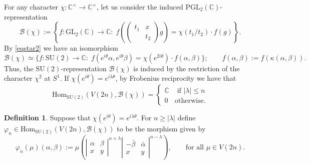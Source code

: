 \documentclass{amsart}
\theoremstyle{definition}
\newtheorem{definition}[theorem]{Definition}
\theoremstyle{remark}
\numberwithin{equation}{section}
\newcommand{\PGL}{{\mathrm{PGL}}}
\newcommand{\GL}{{\mathrm{GL}}}
\newcommand{\SU}{{\mathrm{SU}}}
\newcommand{\C}{{\mathbb C}}
\newcommand{\cB}{{\mathcal B}}
\newcommand{\Hom}{{\mathrm {Hom}}}
\begin{document}
For any character $\chi:\C^\times\rightarrow\C^\times$,
let us consider the induced $\PGL_2(\C)$-representation
\[
\cB(\chi):=\left\{f:\GL_2(\C)\rightarrow\C:\;f\left(\left(\begin{array}{cc}t_1&x\\&t_2\end{array}\right)g\right)=\chi(t_1/t_2)\cdot f(g)\right\}.
\]
By \eqref{eqstar2} we have an isomorphism
$$\cB(\chi)\simeq\{f:\SU(2)\rightarrow\C:\;f(e^{i\theta}\alpha,e^{i\theta}\beta)=\chi(e^{2i\theta})\cdot f(\alpha,\beta)\};\qquad f(\alpha,\beta):=f(\kappa(\alpha,\beta)).$$
Thus, the $\SU(2)$-representation $\cB(\chi)$ is induced by the restriction of the character $\chi^2$ at $S^1$. If $\chi(e^{i\theta}) = e^{i\lambda\theta}$, by Frobenius reciprocity we have that
\begin{equation}\label{homsV}
\Hom_{\SU(2)}(V(2n),\cB(\chi))= \begin{cases}\C &\text{ if }|\lambda|\leq n\\
0&\mbox{otherwise.}
\end{cases}
\end{equation}
\begin{definition}\label{defvarphi}
Suppose that $\chi(e^{i\theta})=e^{i\lambda\theta}$. For $n\geq|\lambda|$ define $\varphi_n\in\Hom_{\SU(2)}(V(2n),\cB(\chi))$ to be the morphism given by
\begin{equation}\label{morfvarphn}
\varphi_n(\mu)(\alpha,\beta):=\mu\left(\left|\begin{array}{cc}\alpha&\beta\\x&y\end{array}\right|^{n+\lambda}\left|\begin{array}{cc}-\bar\beta&\bar\alpha\\x&y\end{array}\right|^{n-\lambda}\right), \qquad\mbox{for all }\mu\in V(2n).
\end{equation}
\end{definition}
\end{document}
